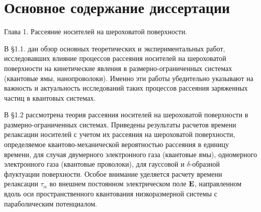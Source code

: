 \newcommand{\actuality}{\underline{\textbf{\actualityTXT}}}
\newcommand{\progress}{\underline{\textbf{\progressTXT}}}
\newcommand{\aim}{\underline{{\textbf\aimTXT}}}
\newcommand{\tasks}{\underline{\textbf{\tasksTXT}}}
\newcommand{\novelty}{\underline{\textbf{\noveltyTXT}}}
\newcommand{\influence}{\underline{\textbf{\influenceTXT}}}
\newcommand{\methods}{\underline{\textbf{\methodsTXT}}}
\newcommand{\defpositions}{\underline{\textbf{\defpositionsTXT}}}
\newcommand{\reliability}{\underline{\textbf{\reliabilityTXT}}}
\newcommand{\probation}{\underline{\textbf{\probationTXT}}}
\newcommand{\contribution}{\underline{\textbf{\contributionTXT}}}
\newcommand{\publications}{\underline{\textbf{\publicationsTXT}}}



\section*{Основное содержание диссертации}

Глава 1. Рассеяние носителей на шероховатой поверхности.

В §1.1. дан обзор основных теоретических и экспериментальных работ, исследовавших влияние процессов рассеяния носителей на шероховатой поверхности на кинетические явления в размерно-ограниченных системах (квантовые ямы, нанопроволоки). Именно эти работы убедительно указывают на важность и актуальность исследований таких процессов рассеяния заряженных частиц в квантовых системах.

В §1.2 рассмотрена теория рассеяния носителей на шероховатой поверхности в размерно-ограниченных системах. Приведены результаты расчетов времени релаксации носителей с учетом их рассеяния на шероховатой поверхности, определяемое квантово-механической вероятностью рассеяния в единицу времени, для случая двумерного электронного газа (квантовые ямы), одномерного электронного газа (квантовые проволоки), для гауссовой и $\delta$-образной флуктуации поверхности. Особое внимание уделяется расчету времени релаксации $\tau_\alpha$ во внешнем постоянном электрическом поле $\boldsymbol{\mathbf{E}}$, направленном вдоль оси пространственного квантования низкоразмерной системы с параболическим потенциалом.

